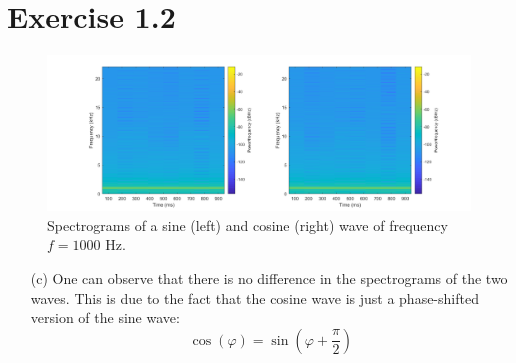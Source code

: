 \documentclass[12pt]{article}
\begin{document}
\section*{Exercise 1.2}
\begin{figure}[h]
    \centering
    \includegraphics[width=\textwidth]{spectrograms}
    \caption{Spectrograms of a sine (left) and cosine (right) wave of frequency $f = 1000$ Hz.}
\end{figure}

\begin{itemize}
    \item [(c)] One can observe that there is no difference in the spectrograms of the two waves. This is due to the fact that the cosine wave is just a phase-shifted version of the sine wave:
    \[\cos(\varphi) = \sin\left(\varphi+\frac{\pi}{2}\right)\]
\end{itemize}
 
 
\end{document}
